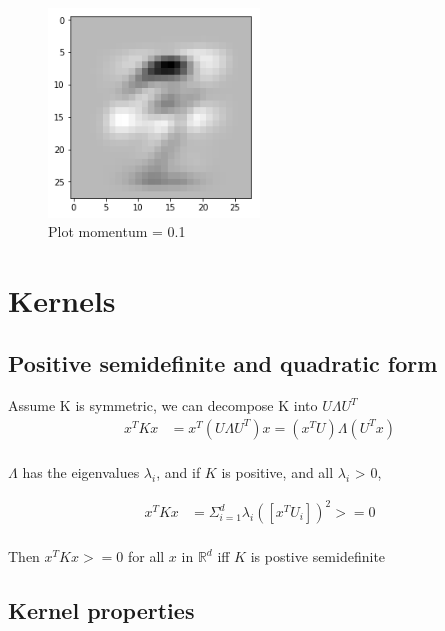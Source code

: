 \documentclass[letterpaper, 12]{article}
\begin{document}
\begin{figure}[H]
\centering
\includegraphics[width=0.5\textwidth]{q_2_3_2.png}
\caption{\label{}Plot momentum = 0.1 }
\end{figure}



\section{Kernels}
\subsection{Positive semidefinite and quadratic form}
Assume K is symmetric, we can decompose K into $U \Lambda U^T$
\begin{equation*}
\begin{split}
x^T K x &= x^T (U \Lambda U^T) x = (x^T U) \Lambda (U^T x)\\
\end{split}
\end{equation*}

$\Lambda$ has the eigenvalues $\lambda_{i}$, and if $K$ is positive, and all $\lambda_{i}$ > 0,

\begin{equation*}
\begin{split}
x^T K x &= \Sigma_{i =1}^{d} \lambda_{i} ([x^T U_{i}])^2 >= 0\\
\end{split}
\end{equation*}

Then $x^T K x >= 0$ for all $x$ in $ \mathbb{R}^{d}$ iff $K$ is postive semidefinite

\subsection{Kernel properties}
\end{document}
